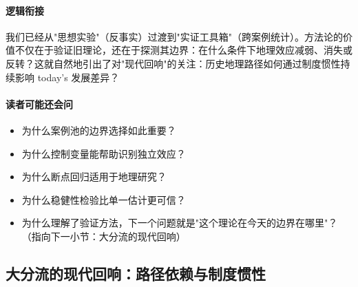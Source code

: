 \documentclass[../main.tex]{subfiles}
\begin{document}
	\paragraph*{逻辑衔接}
我们已经从"思想实验"（反事实）过渡到"实证工具箱"（跨案例统计）。方法论的价值不仅在于验证旧理论，还在于探测其边界：在什么条件下地理效应减弱、消失或反转？这就自然地引出了对"现代回响"的关注：历史地理路径如何通过制度惯性持续影响 today's 发展差异？

\paragraph*{读者可能还会问}
\begin{itemize}
\item 为什么案例池的边界选择如此重要？
\item 为什么控制变量能帮助识别独立效应？
\item 为什么断点回归适用于地理研究？
\item 为什么稳健性检验比单一估计更可信？
\item 为什么理解了验证方法，下一个问题就是"这个理论在今天的边界在哪里"？（指向下一小节：大分流的现代回响）
\end{itemize}
	

	\subsection{大分流的现代回响：路径依赖与制度惯性}
\end{document}
